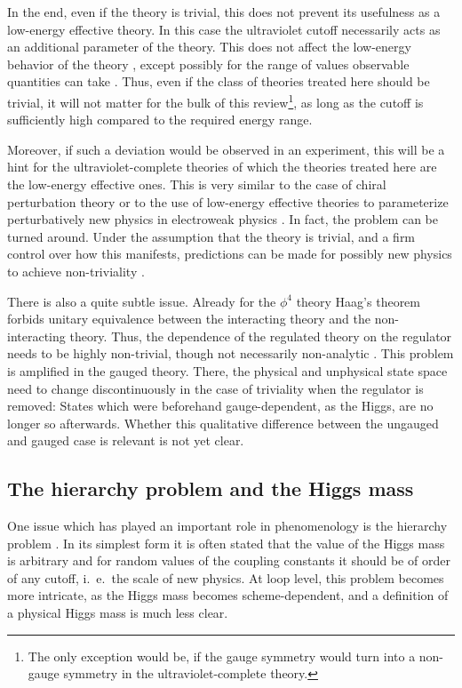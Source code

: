 \documentclass[final,twoside,12pt]{article}
\newcommand*{\1}{1\!\!\!\bot}
\begin{document}
In the end, even if the theory is trivial, this does not prevent its usefulness as a low-energy effective theory. In this case the ultraviolet cutoff necessarily acts as an additional parameter of the theory. This does not affect the low-energy behavior of the theory \cite{Hasenfratz:1986za}, except possibly for the range of values observable quantities can take \cite{Eichhorn:2015kea}. Thus, even if the class of theories treated here should be trivial, it will not matter for the bulk of this review\footnote{The only exception would be, if the gauge symmetry would turn into a non-gauge symmetry in the ultraviolet-complete theory.}, as long as the cutoff is sufficiently high compared to the required energy range.

Moreover, if such a deviation would be observed in an experiment, this will be a hint for the ultraviolet-complete theories of which the theories treated here are the low-energy effective ones. This is very similar to the case of chiral perturbation theory \cite{BeiglboCk:2006lfa} or to the use of low-energy effective theories to parameterize perturbatively new physics in electroweak physics \cite{deFlorian:2016spz}. In fact, the problem can be turned around. Under the assumption that the theory is trivial, and a firm control over how this manifests, predictions can be made for possibly new physics to achieve non-triviality \cite{Bezrukov:2012sa,Eichhorn:2017ylw,Christiansen:2017cxa}.

There is also a quite subtle issue. Already for the $\phi^4$ theory Haag's theorem \cite{Haag:1992hx} forbids unitary equivalence between the interacting theory and the non-interacting theory. Thus, the dependence of the regulated theory on the regulator needs to be highly non-trivial, though not necessarily non-analytic \cite{Glimm:1987ng}. This problem is amplified in the gauged theory. There, the physical and unphysical state space need to change discontinuously in the case of triviality when the regulator is removed: States which were beforehand gauge-dependent, as the Higgs, are no longer so afterwards. Whether this qualitative difference between the ungauged and gauged case is relevant is not yet clear.

\subsection{The hierarchy problem and the Higgs mass}\label{ss:hierarchy}

One issue which has played an important role in phenomenology is the hierarchy problem \cite{Feng:2013pwa,Morrissey:2009tf}. In its simplest form it is often stated that the value of the Higgs mass is arbitrary and for random values of the coupling constants it should be of order of any cutoff, i.\ e.\ the scale of new physics. At loop level, this problem becomes more intricate, as the Higgs mass becomes scheme-dependent, and a definition of a physical Higgs mass is much less clear.
\end{document}
